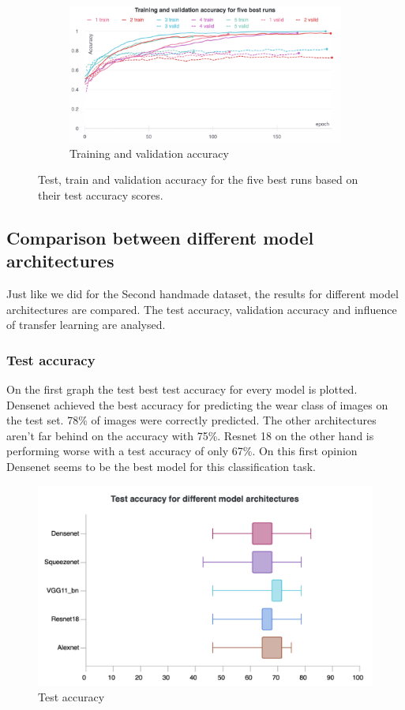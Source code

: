 \begin{figure}[hbtp]
\begin{subfigure}{0.49\textwidth}
		\end{subfigure}
		\hspace*{\fill}
		\centering
		\begin{subfigure}{0.6\textwidth}
			\centering
			\includegraphics[width=\linewidth]{fig/results/wandb/spaghetti_dataset/charts/train_valid_accuracy.png}
			\caption{Training and validation accuracy}
			\label{fig:res:sd:va}
		\end{subfigure}
		\hspace*{\fill}
		\caption{Test, train and validation accuracy for the five best runs based on their test accuracy scores.}
	\end{figure}
	
	\subsection{Comparison between different model architectures}
		Just like we did for the Second handmade dataset, the results for different model architectures are compared. The test accuracy, validation accuracy and influence of transfer learning are analysed.
		\subsubsection{Test accuracy}
			On the first graph the test best test accuracy for every model is plotted. Densenet achieved the best accuracy for predicting the wear class of images on the test set. 78\% of images were correctly predicted. The other architectures aren't far behind on the accuracy with 75\%. Resnet 18 on the other hand is performing worse with a test accuracy of only 67\%. On this first opinion Densenet seems to be the best model for this classification task.

	\begin{figure}[hbtp]
		\centering
		\includegraphics[width=0.5\linewidth]{fig/results/wandb/spaghetti_dataset/charts/Section-6-Panel-0-5bt9qjs32}
		\caption{Test accuracy}
	\end{figure}
	
